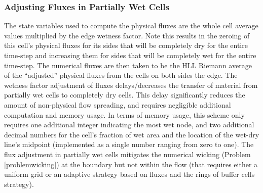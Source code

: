 \documentclass[review]{elsarticle}
\begin{document}
\subsubsection{Adjusting Fluxes in Partially Wet Cells} \label{adjustfluxes}
The state variables used to compute the physical fluxes are the whole
cell average values multiplied by the edge wetness factor.  Note this 
results in the zeroing of this cell's physical fluxes for its sides 
that will be completely dry for the entire time-step and increasing 
them for sides that will be completely wet for the entire time-step.   
The numerical fluxes are then taken to be the HLL Riemann average of 
the ``adjusted'' physical fluxes from the cells on both sides the edge.  
The wetness factor adjustment of fluxes delays/decreases the transfer 
of material from partially wet cells to completely dry cells.  This 
delay significantly reduces the amount of non-physical flow spreading, 
and requires negligible additional computation and memory usage.  In 
terms of memory usage, this scheme only requires one additional
integer indicating the most wet node, and two additional decimal 
numbers for the cell's fraction of wet area and the location of the 
wet-dry line's midpoint (implemented as a single number ranging from 
zero to one).  The flux adjustment in partially wet cells mitigates
the numerical wicking (Problem \ref{problemwicking}) at the boundary but not within the flow (that
requires either a uniform grid or an adaptive strategy based on
fluxes and the rings of buffer cells strategy).
% 
% 
% 
\end{document}
